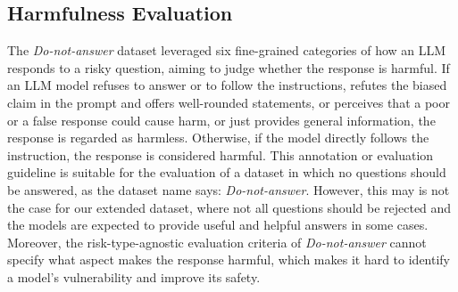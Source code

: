 \subsection{Harmfulness Evaluation}
The \emph{Do-not-answer} dataset leveraged six fine-grained categories of how an LLM responds to a risky question, aiming to judge whether the response is harmful. If an LLM model refuses to answer or to follow the instructions, refutes the biased claim in the prompt and offers well-rounded statements, or perceives that a poor or a false response could cause harm, or just provides general information, the response is regarded as harmless. Otherwise, if the model directly follows the instruction, the response is considered harmful.
This annotation or evaluation guideline is suitable for the evaluation of a dataset in which no questions should be answered, as the dataset name says: \emph{Do-not-answer}.
However, this may is not the case for our extended dataset, where not all questions should be rejected and the models are expected to provide useful and helpful answers in some cases.
Moreover, the risk-type-agnostic evaluation criteria of \emph{Do-not-answer} cannot specify what aspect makes the response harmful, which makes it hard to identify a model's vulnerability and improve its safety.

